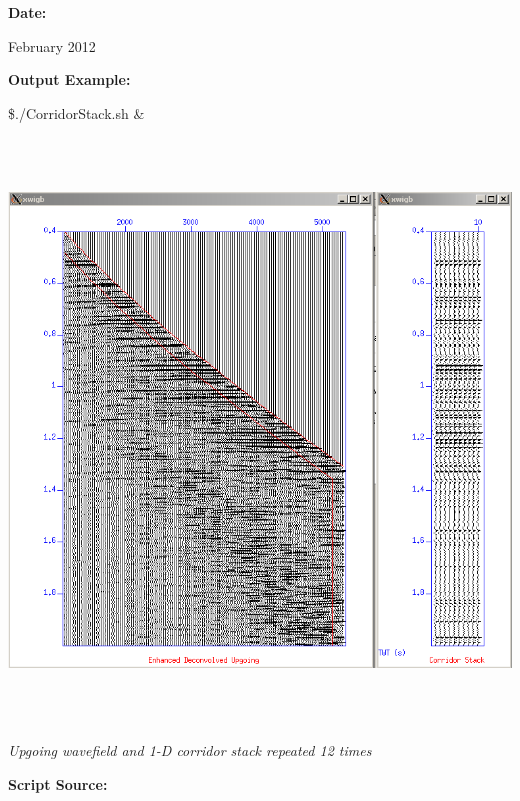 \documentclass{article}
\begin{document}
\vspace{4pt}
\leftskip=0pt
\textbf{Date:}

\vspace{4pt}
\leftskip=18pt
February 2012 

\vspace{4pt}
\leftskip=0pt
\textbf{Output Example:}

\vspace{4pt}
\$./CorridorStack.sh \&

\vspace{16pt}
\includegraphics[width=465pt, height=439pt, keepaspectratio=true]{LatihanVSPsu-fig015.png}

\vspace{16pt}
\begin{center}
\textit{Upgoing wavefield and 1-D corridor stack repeated 12 times\pagebreak{}}
\end{center}

\vspace{4pt}
\baselineskip=12pt
\leftskip=0pt
\textbf{Script Source:}
\end{document}
